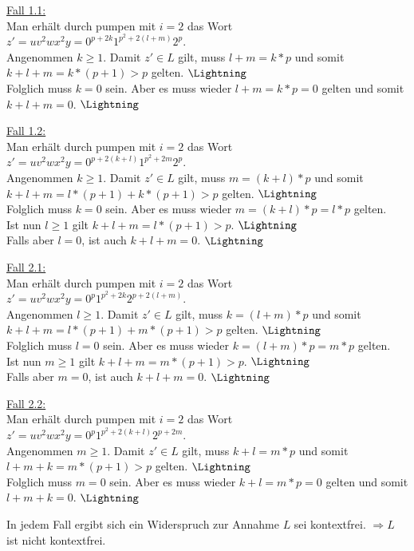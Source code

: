 	\underline{Fall 1.1:}\\
	Man erhält durch pumpen mit $i = 2$ das Wort $z'=uv^2wx^2y=0^{p+2k}1^{p^2+2(l+m)}2^{p}$.\\
	Angenommen $k\geq 1$. Damit $z' \in L$ gilt, muss $l+m = k*p$ und somit $k+l+m=k*(p+1)>p$ gelten. $\mbox{\Lightning}$\\
	Folglich muss $k=0$ sein. Aber es muss wieder $l+m = k*p = 0$ gelten und somit $k+l+m=0$. $\mbox{\Lightning}$

	\underline{Fall 1.2:}\\
	Man erhält durch pumpen mit $i = 2$ das Wort $z'=uv^2wx^2y=0^{p+2(k+l)}1^{p^2+2m}2^{p}$.\\
	Angenommen $k\geq 1$. Damit $z' \in L$ gilt, muss $m = (k+l)*p$ und somit $k+l+m=l*(p+1)+k*(p+1)>p$ gelten. $\mbox{\Lightning}$\\
	Folglich muss $k=0$ sein. Aber es muss wieder $m = (k+l)*p = l*p$ gelten.\\
	Ist nun $l\geq 1$ gilt $k+l+m=l*(p+1)>p$. $\mbox{\Lightning}$\\
	Falls aber $l=0$, ist auch $k+l+m=0$. $\mbox{\Lightning}$

	\underline{Fall 2.1:}\\
	Man erhält durch pumpen mit $i = 2$ das Wort $z'=uv^2wx^2y=0^{p}1^{p^2+2k}2^{p+2(l+m)}$.\\
	Angenommen $l\geq 1$. Damit $z' \in L$ gilt, muss $k = (l+m)*p$ und somit $k+l+m=l*(p+1)+m*(p+1)>p$ gelten. $\mbox{\Lightning}$\\
	Folglich muss $l=0$ sein. Aber es muss wieder $k = (l+m)*p = m*p$ gelten.\\
	Ist nun $m\geq 1$ gilt $k+l+m=m*(p+1)>p$. $\mbox{\Lightning}$\\
	Falls aber $m=0$, ist auch $k+l+m=0$. $\mbox{\Lightning}$

	\underline{Fall 2.2:}\\
	Man erhält durch pumpen mit $i = 2$ das Wort $z'=uv^2wx^2y=0^{p}1^{p^2+2(k+l)}2^{p+2m}$.\\
	Angenommen $m\geq 1$. Damit $z' \in L$ gilt, muss $k+l = m*p$ und somit $l+m+k=m*(p+1)>p$ gelten. $\mbox{\Lightning}$\\
	Folglich muss $m=0$ sein. Aber es muss wieder $k+l = m*p = 0$ gelten und somit $l+m+k=0$. $\mbox{\Lightning}$

	In jedem Fall ergibt sich ein Widerspruch zur Annahme $L$ sei kontextfrei. $\Rightarrow L$ ist nicht kontextfrei.
		


\newpage